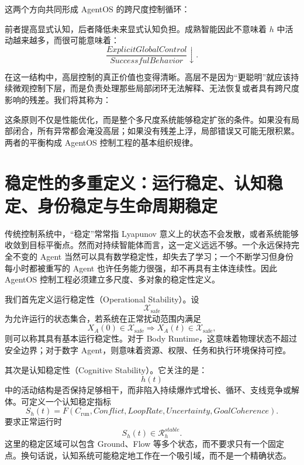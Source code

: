 这两个方向共同形成 AgentOS 的跨尺度控制循环：
\begin{statementbox}
\centering
{}
\end{statementbox}
前者提高显式认知，后者降低未来显式认知负担。成熟智能因此不意味着 $h$ 中活动越来越多，而很可能意味着：
\[
\frac{
ExplicitGlobalControl
}{
SuccessfulBehavior
}
\downarrow.
\]

在这一结构中，高层控制的真正价值也变得清晰。高层不是因为“更聪明”就应该持续微观控制下层，而是负责处理那些局部闭环无法解释、无法恢复或者具有跨尺度影响的残差。我们将其称为：
\begin{statementbox}
\centering
{}
\end{statementbox}
这条原则不仅是性能优化，而是整个多尺度系统能够稳定扩张的条件。如果没有局部闭合，所有异常都会淹没高层；如果没有残差上浮，局部错误又可能无限积累。两者的平衡构成 AgentOS 控制工程的基本组织规律。

\section{稳定性的多重定义：运行稳定、认知稳定、身份稳定与生命周期稳定}

传统控制系统中，“稳定”常常指 Lyapunov 意义上的状态不会发散，或者系统能够收敛到目标平衡点。然而对持续智能体而言，这一定义远远不够。一个永远保持完全不变的 Agent 当然可以具有数学稳定性，却失去了学习；一个不断学习但身份每小时都被重写的 Agent 也许任务能力很强，却不再具有主体连续性。因此 AgentOS 控制工程必须建立多尺度、多对象的稳定性定义。

我们首先定义运行稳定性（Operational Stability）。设
\[
\mathcal X_{\mathrm{safe}}
\]
为允许运行的状态集合，若系统在正常扰动范围内满足
\[
X_A(0)\in\mathcal X_{\mathrm{safe}}
\Rightarrow
X_A(t)\in\mathcal X_{\mathrm{safe}},
\]
则可以称其具有基本运行稳定性。对于 Body Runtime，这意味着物理状态不超过安全边界；对于数字 Agent，则意味着资源、权限、任务和执行环境保持可控。

其次是认知稳定性（Cognitive Stability）。它关注的是：
\[
h(t)
\]
中的活动结构是否保持足够相干，而非陷入持续爆炸式增长、循环、支线竞争或解体。可定义一个认知稳定指标
\[
S_h(t)
=
F(
C_{\mathrm{run}},
Conflict,
LoopRate,
Uncertainty,
GoalCoherence
).
\]
要求正常运行时
\[
S_h(t)\in\mathcal R_h^{stable}.
\]
这里的稳定区域可以包含 Ground、Flow 等多个状态，而不要求只有一个固定点。换句话说，认知系统可能稳定地工作在一个吸引域，而不是一个精确状态。

